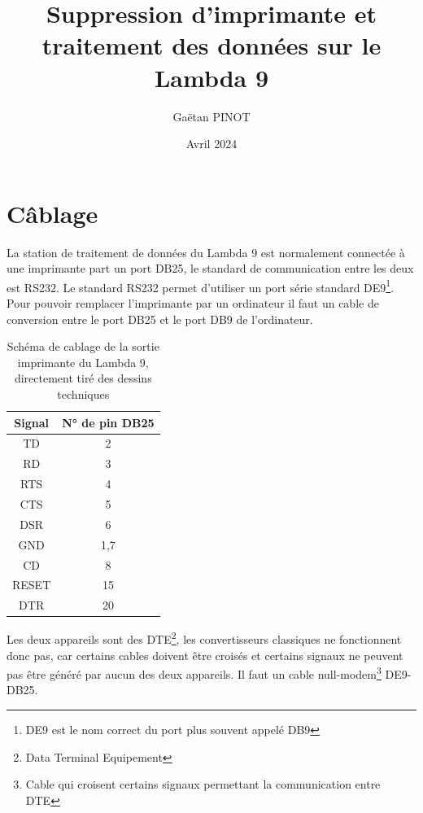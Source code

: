 \documentclass[a4paper, 12pt]{article}
\title{\Large\textbf{Suppression d'imprimante et traitement des données sur le Lambda 9}}
\author{Gaëtan PINOT}
\date{Avril 2024}
\begin{document}
\maketitle

\newpage


\section{Câblage}\label{cablage}

La station de traitement de données du Lambda 9 est normalement connectée à une imprimante part un port DB25, le standard de communication entre les deux est RS232.
Le standard RS232 permet d'utiliser un port série standard DE9\footnote{DE9 est le nom correct du port plus souvent appelé DB9 %
}.
Pour pouvoir remplacer l'imprimante par un ordinateur il faut un cable de conversion entre le port DB25 et le port DB9 de l'ordinateur.


\begin{table}[htb]
	\begin{tabular}{|c|c|}
		\hline
		Signal & N° de pin DB25 \\ \hline
		TD     & 2              \\ \hline
		RD     & 3              \\ \hline
		RTS    & 4              \\ \hline
		CTS    & 5              \\ \hline
		DSR    & 6              \\ \hline
		GND    & 1,7            \\ \hline
		CD     & 8              \\ \hline
		RESET  & 15             \\ \hline
		DTR    & 20             \\ \hline
	\end{tabular}
	\centering
	\caption{Schéma de cablage de la sortie imprimante du Lambda 9, directement tiré des dessins techniques}
	\label{table:pinoutLambda}
\end{table}

Les deux appareils sont des DTE\footnote{Data Terminal Equipement}, les convertisseurs classiques ne fonctionnent donc pas, car certains cables doivent être croisés et certains signaux ne peuvent pas être généré par aucun des deux appareils.
Il faut un cable null-modem\footnote{Cable qui croisent certains signaux permettant la communication entre DTE} DE9-DB25.
\end{document}
